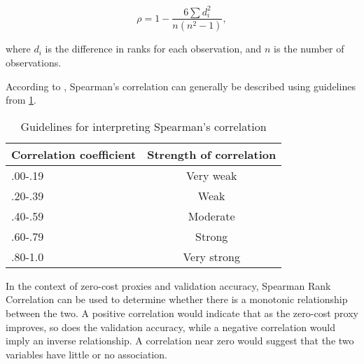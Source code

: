 \begin{equation} 
    \rho = 1 - \frac{6 \sum d_i^2}{n(n^2 - 1)}, 
    \label{eq:spearman}
 \end{equation}

where $d_i$ is the difference in ranks for each observation, and $n$ is the number of observations.

According to \cite{spear}, Spearman's correlation can generally be described using guidelines from \cref{tab:correlation}. 

\begin{table}[ht]
\caption{Guidelines for interpreting Spearman's correlation}
\centering
\begin{tabular}{lc}
\textbf{Correlation coefficient} & \textbf{Strength of correlation} \\ \hline
\multicolumn{1}{l|}{.00-.19} & Very weak \\
\multicolumn{1}{l|}{\cellcolor{verylightgray}.20-.39} & \cellcolor{verylightgray}Weak \\
\multicolumn{1}{l|}{.40-.59} & Moderate \\
\multicolumn{1}{l|}{\cellcolor{verylightgray}.60-.79} & \cellcolor{verylightgray}Strong \\
\multicolumn{1}{l|}{.80-1.0} & Very strong \\
\end{tabular}

\label{tab:correlation}
\end{table}


In the context of zero-cost proxies and validation accuracy, Spearman Rank Correlation can be used to determine whether there is a monotonic relationship between the two. A positive correlation would indicate that as the zero-cost proxy improves, so does the validation accuracy, while a negative correlation would imply an inverse relationship. A correlation near zero would suggest that the two variables have little or no association. 



